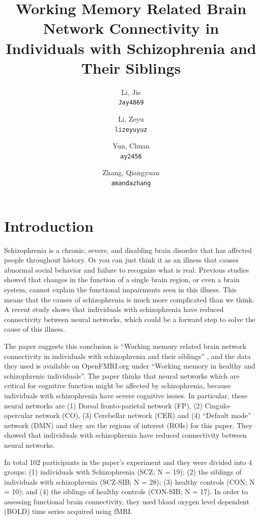 \documentclass[11pt]{article}
\title{Working Memory Related Brain Network Connectivity in Individuals with Schizophrenia and Their Siblings}
\author{
  Li, Jie\\
  \texttt{Jay4869}
  \and
  Li, Zeyu\\
  \texttt{lizeyuyuz}
  \and
  Yun, Chuan\\
  \texttt{ay2456}
  \and
  Zhang, Qiangyuan\\
  \texttt{amandazhang}
}
\begin{document}
\maketitle


\section{Introduction}

Schizophrenia is a chronic, severe, and disabling brain disorder that has affected people throughout history. Or you can just think it as an illness that causes abnormal social behavior and failure to recognize what is real. Previous studies showed that changes in the function of a single brain region, or even a brain system, cannot explain the functional impairments seen in this illness. This means that the causes of schizophrenia is much more complicated than we think. A recent study shows that individuals with schizophrenia have reduced connectivity between neural networks, which could be a forward step to solve the cause of this illness.

The paper suggests this conclusion is ``Working memory related brain network connectivity in individuals with schizophrenia and their siblings'' \cite{schizophreniabrainconnectivity}, and the data they used is available on OpenFMRI.org under ``Working memory in healthy and schizophrenic individuals''. The paper thinks that neural networks which are critical for cognitive function might be affected by schizophrenia, because individuals with schizophrenia have severe cognitive issues. In particular, these neural networks are (1) Dorsal fronto-parietal network (FP), (2) Cingulo-opercular network (CO), (3) Cerebellar network (CER) and (4) ``Default mode'' network (DMN) and they are the regions of interest (ROIs) for this paper. They showed that individuals with schizophrenia have reduced connectivity between neural networks.

In total 102 participants in the paper's experiment and they were divided into 4 groups: (1) individuals with Schizophrenia (SCZ; N = 19); (2) the siblings of individuals with schizophrenia (SCZ-SIB; N = 28); (3) healthy controls (CON; N = 10); and (4) the siblings of healthy controls (CON-SIB; N = 17). In order to assessing functional brain connectivity, they used blood oxygen level dependent (BOLD) time series acquired using fMRI. 
\end{document}
